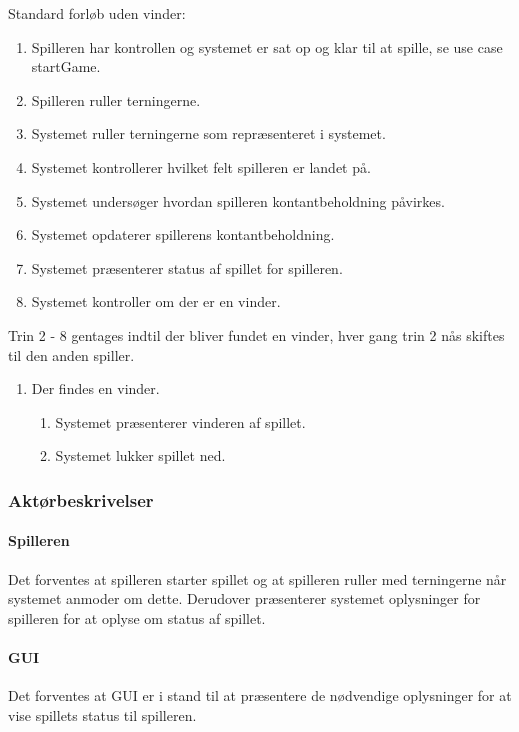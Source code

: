 Standard forløb uden vinder:
\begin{enumerate}
\item Spilleren har kontrollen og systemet er sat op og klar til at spille, se use case startGame.
\item Spilleren ruller terningerne.
\item Systemet ruller terningerne som repræsenteret i systemet.
\item Systemet kontrollerer hvilket felt spilleren er landet på.
\item Systemet undersøger hvordan spilleren kontantbeholdning påvirkes.
\item Systemet opdaterer spillerens kontantbeholdning.
\item Systemet præsenterer status af spillet for spilleren.
\item Systemet kontroller om der er en vinder.
\end{enumerate}
Trin 2 - 8 gentages indtil der bliver fundet en vinder, hver gang trin 2 nås skiftes til den anden spiller.

\begin{enumerate}[8a.]
\item Der findes en vinder.
	\begin{enumerate}[1.]
	\item Systemet præsenterer vinderen af spillet.
	\item Systemet lukker spillet ned.
	\end{enumerate}
\end{enumerate}

\subsubsection{Aktørbeskrivelser}

\paragraph{Spilleren} Det forventes at spilleren starter spillet og at spilleren ruller med terningerne når systemet anmoder om dette. Derudover præsenterer systemet oplysninger for spilleren for at oplyse om status af spillet.

\paragraph{GUI} Det forventes at GUI er i stand til at præsentere de nødvendige oplysninger for at vise spillets status til spilleren.
